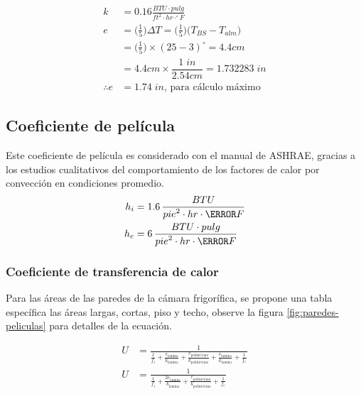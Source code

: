  \begin{equation}
 	 \begin{aligned}
 	 k &= 0.16\frac{BTU \cdot pulg}{ft^2 \cdot hr \cdot ^\circ F}\\
 	 e&=\Big(\frac{1}{5}\Big)\Delta T = \Big(\frac{1}{5}\Big)\big(T_{BS}- T_{alm}\big)\\ 	
 	 &=  \Big(\frac{1}{5}\Big)\times (25-3)^\circ =4{.}4 cm\\
 	 &= 4{.}4 cm \times \dfrac{1\; in}{2{.}54 cm} =1{.}732283\; in\\
 	 \therefore e&= 1{.}74\; in \text{, para cálculo máximo}
 \end{aligned}
 \end{equation}
 \subsection{Coeficiente de película}
	Este coeficiente de película es considerado con el manual de ASHRAE, gracias a los
	estudios cualitativos del comportamiento de los factores de calor por convección en
	condiciones promedio.	
	\begin{equation}
		\begin{aligned}
			h_i &= 1.6 \, \frac{{BTU}}{{pie}^2 \cdot {hr} \cdot \degree F} \\
			h_e &= 6\, \frac{{BTU} \cdot {pulg}}{{pie}^2 \cdot {hr} \cdot \degree F}
		\end{aligned}
	\end{equation}
	
 \subsubsection{Coeficiente de transferencia de calor}
Para las áreas de las paredes de la cámara frigorífica, se propone una tabla específica
las áreas largas, cortas, piso y techo, observe la figura \ref{fig:paredes-peliculas} para detalles de la ecuación.

  \begin{equation}
  	\begin{aligned}
  		U &= \frac{1}{\frac{1}{f_i} + \frac{e_{\text{lamina}}}{k_{\text{lamina}}} + \frac{e_{\text{poliuretano}}}{k_{\text{poliuretano}}} + \frac{e_{\text{lamina}}}{k_{\text{lamina}}} + \frac{1}{f_e}} \\
  		U &= \frac{1}{\frac{1}{f_i} + \frac{2 e_{\text{lamina}}}{k_{\text{lamina}}} + \frac{e_{\text{poliuretano}}}{k_{\text{poliuretano}}} + \frac{1}{f_e}} \\
  	\end{aligned}
  	\label{eq:coef-transf-calor}
  \end{equation}


